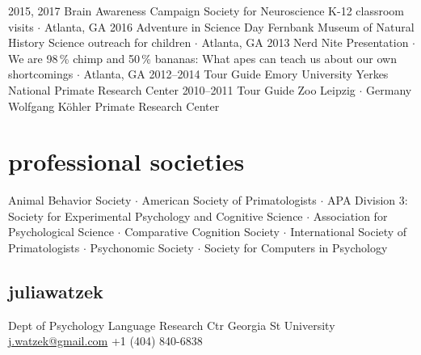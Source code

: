 \documentclass[]{friggeri-cv}
\begin{document}
\begin{entrylist}
  \entry
    {2015, 2017}
    {Brain Awareness Campaign}
    {Society for Neuroscience}
    {K-12 classroom visits $\cdot$ Atlanta, GA}
  \entry
    {2016}
    {Adventure in Science Day}
    {Fernbank Museum of Natural History}
    {Science outreach for children $\cdot$ Atlanta, GA}
  \entry
    {2013}
    {Nerd Nite}
    {}
    {Presentation $\cdot$ We are 98\,\% chimp and 50\,\% bananas: What apes can teach us about our own shortcomings $\cdot$ Atlanta, GA}
  \entry
    {2012--2014}
    {Tour Guide}
    {Emory University}
    {Yerkes National Primate Research Center}
  \entry
    {2010--2011}
    {Tour Guide}
    {Zoo Leipzig $\cdot$ Germany}
    {Wolfgang K\"{o}hler Primate Research Center}
\end{entrylist}

\section{professional societies}

    Animal Behavior Society $\cdot$ %
    American Society of Primatologists $\cdot$ %
    APA Division 3: Society for Experimental Psychology and Cognitive Science $\cdot$ %
    Association for Psychological Science $\cdot$ %
    Comparative Cognition Society $\cdot$ %
    International Society of Primatologists $\cdot$ %
    Psychonomic Society $\cdot$ %
    Society for Computers in Psychology\\[-.1cm]


\begin{aside}
  \section{{\normalfont julia}watzek}
    Dept of Psychology
    Language Research Ctr
    Georgia St University
    ~
    \href{mailto:j.watzek@gmail.com}{j.watzek@gmail.com}
    +1 (404) 840-6838
\end{aside}
\end{document}
